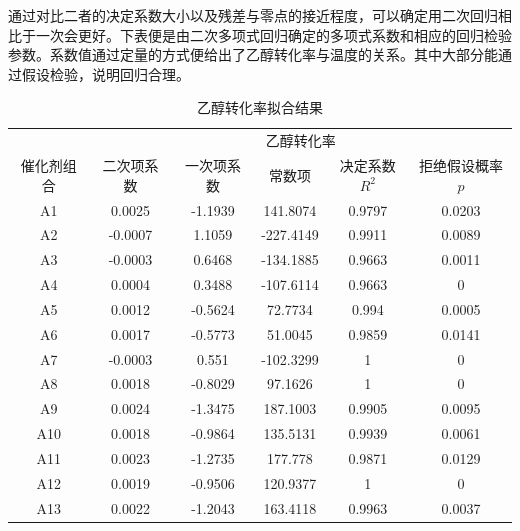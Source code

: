 \documentclass{article}
\begin{document}
	\newpage
	通过对比二者的决定系数大小以及残差与零点的接近程度，可以确定用二次回归相比于一次会更好。下表便是由二次多项式回归确定的多项式系数和相应的回归检验参数。系数值通过定量的方式便给出了乙醇转化率与温度的关系。其中大部分能通过假设检验，说明回归合理。
	\begin{table}[!h]
		\centering
		\caption{乙醇转化率拟合结果}
		\begin{tabular}{|c|c|c|c|c|c|}
			\hline
			& \multicolumn{5}{c|}{乙醇转化率}                                          \\ \cline{2-6} 
			\multirow{-2}{*}{催化剂组合}    & 二次项系数   & 一次项系数    & 常数项       & 决定系数$R^2$ & 拒绝假设概率$p$ \\ \hline
			A1                         & 0.0025  & -1.1939  & 141.8074  & 0.9797                   & 0.0203  \\ \hline
			A2                         & -0.0007 & 1.1059   & -227.4149 & 0.9911                   & 0.0089  \\ \hline
			A3                         & -0.0003 & 0.6468   & -134.1885 & 0.9663                   & 0.0011  \\ \hline
			A4                         & 0.0004  & 0.3488   & -107.6114 & 0.9663                   & 0       \\ \hline
			A5                         & 0.0012  & -0.5624  & 72.7734   & 0.994                    & 0.0005  \\ \hline
			A6                         & 0.0017  & -0.5773  & 51.0045   & 0.9859                   & 0.0141  \\ \hline
			A7                         & -0.0003 & 0.551    & -102.3299 & 1                        & 0       \\ \hline
			A8                         & 0.0018  & -0.8029  & 97.1626   & 1                        & 0       \\ \hline
			A9                         & 0.0024  & -1.3475  & 187.1003  & 0.9905                   & 0.0095  \\ \hline
			A10                        & 0.0018  & -0.9864  & 135.5131  & 0.9939                   & 0.0061  \\ \hline
			A11						   & 0.0023  & -1.2735  & 177.778   & 0.9871                   & 0.0129  \\ \hline
			A12                        & 0.0019  & -0.9506  & 120.9377  & 1                        & 0       \\ \hline
			A13                        & 0.0022  & -1.2043  & 163.4118  & 0.9963                   & 0.0037  \\ \hline

\end{tabular}
\end{table}
\end{document}
